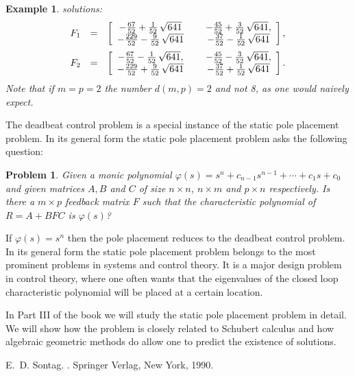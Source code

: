\documentclass[12pt]{report}
\newtheorem{example}[thm]{Example}
\newtheorem{pro}[thm]{Problem}
\newenvironment{ex}{\begin{example}\rm}{\end{example}}
\numberwithin{equation}{chapter}
\numberwithin{figure}{chapter}
\newcommand{\vier}[4]{\left[ \begin{array}{ccc}
                   #1 &\;& #2 \\ #3 &\;& #4 \end{array} \right]}
\begin{document}
\begin{ex}
solutions:
$$
\begin{array}{rcl}
F_1&=&\vier{- {\frac{67}{52}} + {\frac{1}{52}} \,\sqrt{641}}{ -
  {\frac {45}{52}} + {\frac {3}{52}} \,\sqrt{641},}{ -
  {\frac{229}{52}} - {\frac{9}{52}} \,\sqrt{641}}{- 
  {\frac{37}{52}} - {\frac{1}{52}} \,\sqrt{641}},\medskip\\ 
F_2&=&\vier{- {\frac{67}{52}} -\frac{1}{52} \,\sqrt{641},}{-
   {\frac{45}{52}} - {\frac{3}{52}} \,\sqrt{641},}{- {\frac
    {229}{52}} + { \frac{9}{52}} \,\sqrt{641}}{- {\frac{37}{52}}
  + {\frac{1}{52}} \,\sqrt{641}}.
\end{array}
$$
Note that if $m=p=2$ the number $d(m,p)=2$ and not 8, as one
would naively expect.
\end{ex}

The deadbeat control problem is a special instance of the static
pole placement problem. In its
general form the static pole placement problem asks the following
question: 
\begin{pro}
  Given a monic polynomial
  $\varphi(s)=s^n+c_{n-1}s^{n-1}+\cdots+c_1s+c_0$ and given
  matrices $A,B$ and $C$ of size $n\times n$, $n\times m$ and
  $p\times n$ respectively. Is there a $m\times p$ feedback
  matrix $F$ such that the characteristic polynomial of $R=A+BFC$
  is $\varphi(s)$?
\end{pro}

If $\varphi(s)=s^n$ then the pole placement reduces to the
deadbeat control problem. In its general form the static pole
placement problem belongs to the most prominent problems in
systems and control theory. It is a major design problem in
control theory, where one often wants that the eigenvalues of the
closed loop characteristic polynomial
%
will be placed at a certain location.

In Part III of the book we will study the static pole placement
problem in detail. We will show how the problem is closely
related to Schubert calculus
%
and how algebraic geometric methods do allow one to predict the
existence of solutions.


\begin{thebibliography}{1}

E.~D. Sontag.
.
\newblock Springer Verlag, New York, 1990.

\end{thebibliography}
\end{document}
